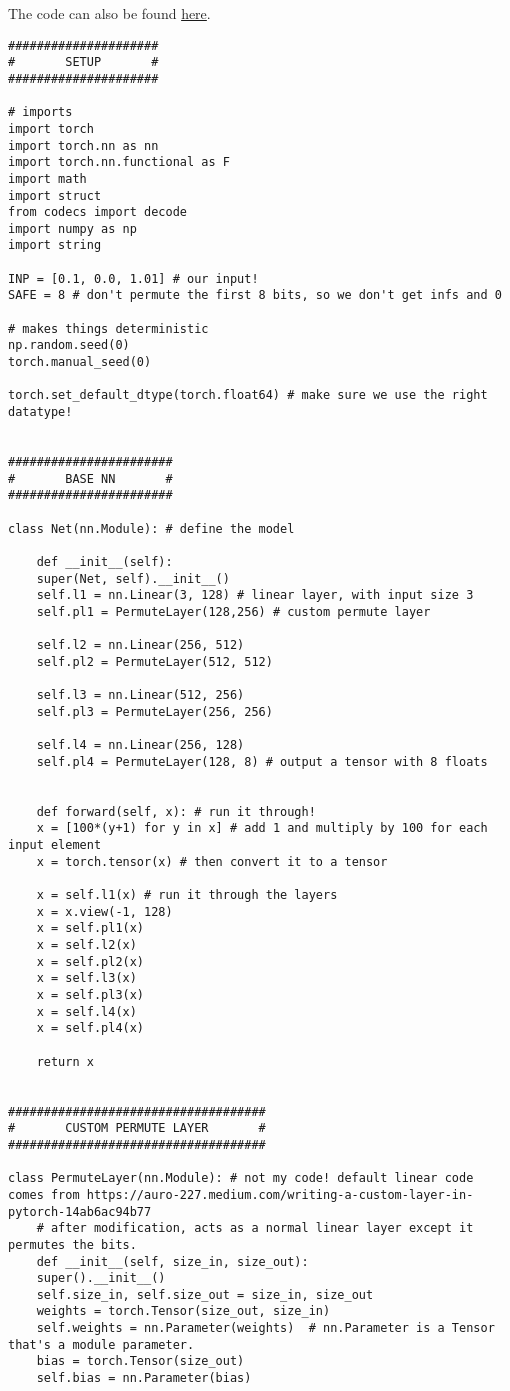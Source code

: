 \documentclass[letterpaper]{article}
\begin{document}
The code can also be found
\href{https://gist.github.com/TheEnquirer/1260b18f40cec198348a0a30d0a19e83}{here}.

\begin{verbatim}
#####################
#       SETUP       #
#####################

# imports
import torch
import torch.nn as nn
import torch.nn.functional as F
import math
import struct
from codecs import decode
import numpy as np
import string

INP = [0.1, 0.0, 1.01] # our input!
SAFE = 8 # don't permute the first 8 bits, so we don't get infs and 0

# makes things deterministic
np.random.seed(0)
torch.manual_seed(0)

torch.set_default_dtype(torch.float64) # make sure we use the right datatype!


#######################
#       BASE NN       #
#######################

class Net(nn.Module): # define the model

    def __init__(self):
	super(Net, self).__init__()
	self.l1 = nn.Linear(3, 128) # linear layer, with input size 3
	self.pl1 = PermuteLayer(128,256) # custom permute layer

	self.l2 = nn.Linear(256, 512)
	self.pl2 = PermuteLayer(512, 512)

	self.l3 = nn.Linear(512, 256)
	self.pl3 = PermuteLayer(256, 256)

	self.l4 = nn.Linear(256, 128)
	self.pl4 = PermuteLayer(128, 8) # output a tensor with 8 floats


    def forward(self, x): # run it through!
	x = [100*(y+1) for y in x] # add 1 and multiply by 100 for each input element
	x = torch.tensor(x) # then convert it to a tensor

	x = self.l1(x) # run it through the layers
	x = x.view(-1, 128)
	x = self.pl1(x)
	x = self.l2(x)
	x = self.pl2(x)
	x = self.l3(x)
	x = self.pl3(x)
	x = self.l4(x)
	x = self.pl4(x)

	return x


####################################
#       CUSTOM PERMUTE LAYER       #
####################################

class PermuteLayer(nn.Module): # not my code! default linear code comes from https://auro-227.medium.com/writing-a-custom-layer-in-pytorch-14ab6ac94b77
    # after modification, acts as a normal linear layer except it permutes the bits.
    def __init__(self, size_in, size_out):
	super().__init__()
	self.size_in, self.size_out = size_in, size_out
	weights = torch.Tensor(size_out, size_in)
	self.weights = nn.Parameter(weights)  # nn.Parameter is a Tensor that's a module parameter.
	bias = torch.Tensor(size_out)
	self.bias = nn.Parameter(bias)


\end{verbatim}
\end{document}
